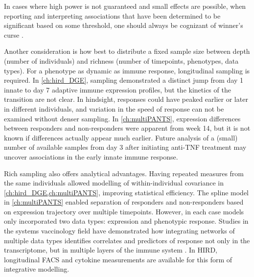 In cases where high power is not guaranteed and small effects are possible,
when reporting and interpreting associations that have been determined to be significant based on some threshold, 
one should always be cognizant of winner's curse \autocite{huang2018PowerFalseDiscovery}.

Another consideration is how best to distribute a fixed sample size between depth (number of individuals) and richness (number of timepoints, phenotypes, data types).
For a phenotype as dynamic as immune response, longitudinal sampling is required.
In \cref{ch:hird_DGE}, sampling demonstrated a distinct jump from day 1 innate to day 7 adaptive immune expression profiles,
but the kinetics of the transition are not clear. 
In hindsight, responses could have peaked earlier or later in different individuals,
and variation in the speed of response can not be examined without denser sampling.
In \cref{ch:multiPANTS}, expression differences between responders and non-responders were apparent from week 14, but it is not known if differences actually appear much earlier.
Future analysis of a (small) number of available samples from day 3 after initiating anti-\gls{TNF} treatment may uncover associations in the early innate immune response.

Rich sampling also offers analytical advantages.
Having repeated measures from the same individuals allowed modelling of within-individual covariance in \cref{ch:hird_DGE,ch:multiPANTS}, improving statistical efficiency.
The spline model in \cref{ch:multiPANTS} enabled separation of responders and non-responders based on expression trajectory over multiple timepoints.
However, in each case models only incorporated two data types: expression and phenotypic response.
Studies in the systems vaccinology field have demonstrated how integrating networks of multiple data types identifies correlates and predictors of response not only in the transcriptome, 
but in multiple layers of the immune system \autocite{li2017MetabolicPhenotypesResponse}.
In \gls{HIRD}, longitudinal \gls{FACS} and cytokine measurements are available for this form of integrative modelling.

